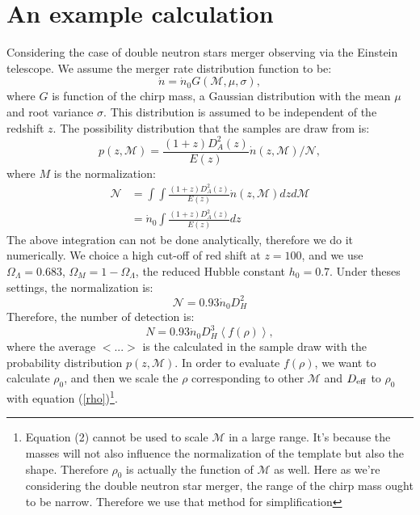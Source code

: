 \documentclass{article}
\begin{document}
\section{An example calculation}
Considering the case of double neutron stars merger observing via the Einstein telescope. We assume the merger rate distribution function to be:
\begin{equation}
    \dot{n}=\dot{n}_0G(\mathcal{M},\mu,\sigma),
\end{equation}
where $G$ is function of the chirp mass, a Gaussian distribution with the mean $\mu$ and root variance $\sigma$. This distribution is assumed to be independent of the redshift $z$. The possibility distribution that the samples are draw from is:
\begin{equation}
    p(z,\mathcal{M})=\frac{(1+z)D^2_A(z)}{E(z)}\dot{n}(z,\mathcal{M})/\mathcal{N}, 
\end{equation}
where $M$ is the normalization: 
\begin{align}
    \mathcal{N}&=\int\int\frac{(1+z)D^2_A(z)}{E(z)}\dot{n}(z,\mathcal{M})dzd\mathcal{M}\\\nonumber
               &=\dot{n}_0\int\frac{(1+z)D^2_A(z)}{E(z)}dz
\end{align}
The above integration can not be done analytically, therefore we do it numerically.  We choice a high cut-off of red shift at $z=100$, and we use $\Omega_\Lambda=0.683$, $\Omega_M=1-\Omega_\Lambda$, the reduced Hubble constant $h_0=0.7$. Under theses settings, the normalization is:
\begin{equation}
    \mathcal{N}=0.93\dot{n}_0D^2_H
\end{equation}
Therefore, the number of detection is:
\begin{equation}
    N=0.93\dot{n}_0D_H^3\left<f(\rho)\right>,
\end{equation}
where the average $<...>$ is the calculated in the sample draw with the probability distribution $p(z,\mathcal{M})$. 
In order to evaluate $f(\rho)$, we want to calculate $\rho_0$, and then we scale the $\rho$ corresponding to other $\mathcal{M}$ and $D_{\rm{eff}}$ to $\rho_0$ with equation (\ref{rho})\footnote{Equation (2) cannot be used to scale $\mathcal{M}$ in a large range. It's because the masses will not also influence the normalization of the template but also the shape. Therefore $\rho_0$ is actually the function of $\mathcal{M}$ as well. Here as we're considering the double neutron star merger, the range of the chirp mass ought to be narrow. Therefore we use that method for simplification}. 
\end{document}
